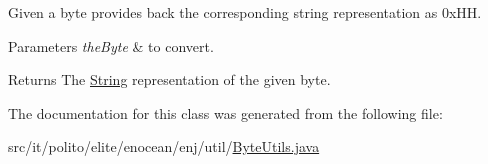 Given a byte provides back the corresponding string representation as 0x\+HH.


\begin{DoxyParams}{Parameters}
{\em the\+Byte} & to convert. \\
\hline
\end{DoxyParams}
\begin{DoxyReturn}{Returns}
The \hyperlink{}{String} representation of the given byte. 
\end{DoxyReturn}


The documentation for this class was generated from the following file\+:\begin{DoxyCompactItemize}
\item 
src/it/polito/elite/enocean/enj/util/\hyperlink{_byte_utils_8java}{Byte\+Utils.\+java}\end{DoxyCompactItemize}
